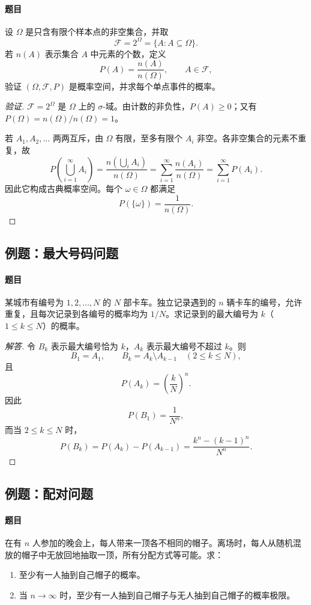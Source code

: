 \paragraph{题目}
设 $\Omega$ 是只含有限个样本点的非空集合，并取
\[
\mathscr{F}=2^\Omega=\{A:A\subseteq\Omega\}.
\]
若 $n(A)$ 表示集合 $A$ 中元素的个数，定义
\[
P(A)=\frac{n(A)}{n(\Omega)},\qquad A\in\mathscr{F},
\]
验证 $(\Omega,\mathscr F,P)$ 是概率空间，并求每个单点事件的概率。

\begin{proof}[验证]
$\mathscr F=2^\Omega$ 是 $\Omega$ 上的 $\sigma$-域。由计数的非负性，$P(A)\geq0$；又有 $P(\Omega)=n(\Omega)/n(\Omega)=1$。

若 $A_1,A_2,\ldots$ 两两互斥，由 $\Omega$ 有限，至多有限个 $A_i$ 非空。各非空集合的元素不重复，故
\[P\left(\bigcup_{i=1}^\infty A_i\right)=\frac{n(\bigcup_i A_i)}{n(\Omega)}=\sum_{i=1}^\infty\frac{n(A_i)}{n(\Omega)}=\sum_{i=1}^\infty P(A_i).\]
因此它构成古典概率空间。每个 $\omega\in\Omega$ 都满足
\[P(\{\omega\})=\frac1{n(\Omega)}.\]
\end{proof}

\subsection{例题：最大号码问题}\label{note:c1:e9}
\paragraph{题目}
某城市有编号为 $1,2,\ldots,N$ 的 $N$ 部卡车。独立记录遇到的 $n$ 辆卡车的编号，允许重复，且每次记录到各编号的概率均为 $1/N$。求记录到的最大编号为 $k$（$1\leq k\leq N$）的概率。

\begin{proof}[解答]
令 $B_k$ 表示最大编号恰为 $k$，$A_k$ 表示最大编号不超过 $k$。则
\[
B_1=A_1,\qquad B_k=A_k\setminus A_{k-1}\quad(2\leq k\leq N),
\]
且
\[
P(A_k)=\left(\frac{k}{N}\right)^n.
\]
因此
\[
P(B_1)=\frac{1}{N^n},
\]
而当 $2\leq k\leq N$ 时，
\[
P(B_k)=P(A_k)-P(A_{k-1})
=\frac{k^n-(k-1)^n}{N^n}.
\]
\end{proof}

\subsection{例题：配对问题}\label{note:c1:e10}
\paragraph{题目}
在有 $n$ 人参加的晚会上，每人带来一顶各不相同的帽子。离场时，每人从随机混放的帽子中无放回地抽取一顶，所有分配方式等可能。求：
\begin{enumerate}
\item 至少有一人抽到自己帽子的概率。
\item 当 $n\to\infty$ 时，至少有一人抽到自己帽子与无人抽到自己帽子的概率极限。
\end{enumerate}

